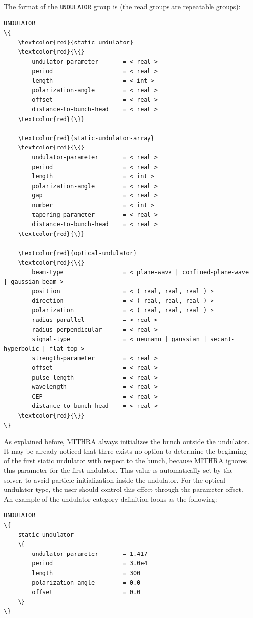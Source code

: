 The format of the \texttt{UNDULATOR} group is (the read groups are repeatable groups):
%
\begin{Verbatim}[frame=single, fontsize=\small, tabsize=4, fontfamily=courier, fontseries=b, commandchars=\\\{\}, obeytabs]
UNDULATOR
\{
	\textcolor{red}{static-undulator}
	\textcolor{red}{\{}
		undulator-parameter		  = < real >
		period					  = < real >
		length					  = < int >
		polarization-angle		  = < real >
		offset					  = < real >
		distance-to-bunch-head 	  = < real >
	\textcolor{red}{\}}

	\textcolor{red}{static-undulator-array}
	\textcolor{red}{\{}
		undulator-parameter		  = < real >
		period					  = < real >
		length					  = < int >
		polarization-angle		  = < real >
		gap						  = < real >
		number					  = < int >
		tapering-parameter		  = < real >
		distance-to-bunch-head    = < real >
	\textcolor{red}{\}}

	\textcolor{red}{optical-undulator}
	\textcolor{red}{\{}
		beam-type				  = < plane-wave | confined-plane-wave | gaussian-beam >
		position				  = < ( real, real, real ) >
		direction				  = < ( real, real, real ) >
		polarization			  = < ( real, real, real ) >
		radius-parallel			  = < real >
		radius-perpendicular	  = < real >
		signal-type				  = < neumann | gaussian | secant-hyperbolic | flat-top >
		strength-parameter		  = < real >
		offset					  = < real >
		pulse-length			  = < real >
		wavelength				  = < real >
		CEP						  = < real >
		distance-to-bunch-head    = < real >
	\textcolor{red}{\}}
\}
\end{Verbatim}
%
As explained before, MITHRA always initializes the bunch outside the undulator.
%
It may be already noticed that there exists no option to determine the beginning of the first static undulator with respect to the bunch, because MITHRA ignores this parameter for the first undulator.
%
This value is automatically set by the solver, to avoid particle initialization inside the undulator.
%
For the optical undulator type, the user should control this effect through the parameter offset.
%
An example of the undulator category definition looks as the following:
%
\begin{snugshade}
\begin{Verbatim}[fontsize=\small, tabsize=4, fontfamily=courier, fontseries=b, commandchars=\\\{\}, obeytabs]
UNDULATOR
\{
	static-undulator
	\{
		undulator-parameter		  = 1.417
    	period					  = 3.0e4
    	length					  = 300
    	polarization-angle		  = 0.0
    	offset					  = 0.0
    \}
\}
\end{Verbatim}
\end{snugshade}
